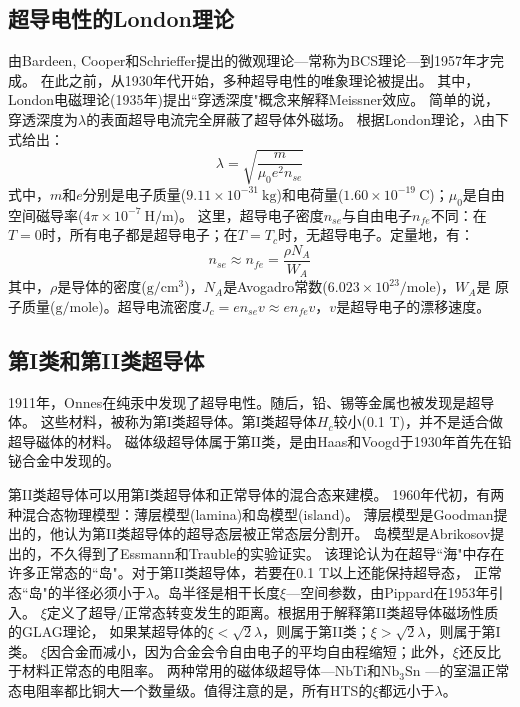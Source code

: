 \subsection{超导电性的London理论}
由Bardeen, Cooper和Schrieffer提出的微观理论---常称为BCS理论---到1957年才完成。
在此之前，从1930年代开始，多种超导电性的唯象理论被提出。
其中，London电磁理论(1935年)提出``穿透深度"概念来解释Meissner效应。
简单的说，穿透深度为$\lambda$的表面超导电流完全屏蔽了超导体外磁场。
根据London理论，$\lambda$由下式给出：
\begin{equation}
\lambda=\sqrt{\frac{m}{\mu_0 e^2 n_{se}}}
\end{equation}
式中，$m$和$e$分别是电子质量($9.11\times 10^{-31}\ \mathrm{kg}$)和电荷量($1.60\times 10^{-19}\ \mathrm{C}$)；$\mu_0$是自由空间磁导率($4\pi \times 10^{-7}\ \mathrm{H/m}$)。
这里，超导电子密度$n_{se}$与自由电子$n_{fe}$不同：在$T=0$时，所有电子都是超导电子；在$T=T_c$时，无超导电子。定量地，有：
\begin{equation}
n_{se}\approx n_{fe}=\frac{\rho N_A}{W_A}
\end{equation}
其中，$\rho$是导体的密度($\mathrm{g/cm^3}$)，$N_A$是Avogadro常数($6.023\times 10^{23}/\mathrm{mole}$)，$W_A$是
原子质量($\mathrm{g/mole}$)。超导电流密度$J_c=e n_{se} v\approx e n_{fe} v$，$v$是超导电子的漂移速度。

\subsection{第I类和第II类超导体}
1911年，Onnes在纯汞中发现了超导电性。随后，铅、锡等金属也被发现是超导体。
这些材料，被称为第I类超导体。第I类超导体$H_c$较小(0.1 T)，并不是适合做超导磁体的材料。
磁体级超导体属于第II类，是由Haas和Voogd于1930年首先在铅铋合金中发现的。

第II类超导体可以用第I类超导体和正常导体的混合态来建模。
1960年代初，有两种混合态物理模型：薄层模型(lamina)和岛模型(island)。
薄层模型是Goodman提出的，他认为第II类超导体的超导态层被正常态层分割开。
岛模型是Abrikosov提出的，不久得到了Essmann和Trauble的实验证实。
该理论认为在超导``海"中存在许多正常态的``岛"。对于第II类超导体，若要在0.1 T以上还能保持超导态，
正常态``岛"的半径必须小于$\lambda$。岛半径是相干长度$\xi$---空间参数，由Pippard在1953年引入。
$\xi$定义了超导/正常态转变发生的距离。根据用于解释第II类超导体磁场性质的GLAG理论，
如果某超导体的$\xi < \sqrt{2}\lambda$，则属于第II类；$\xi >\sqrt{2}\lambda$，则属于第I类。
$\xi$因合金而减小，因为合金会令自由电子的平均自由程缩短；此外，$\xi$还反比于材料正常态的电阻率。
两种常用的磁体级超导体---$\mathrm{NbTi}$和$\mathrm{Nb_3Sn}$
---的室温正常态电阻率都比铜大一个数量级。值得注意的是，所有HTS的$\xi$都远小于$\lambda$。

